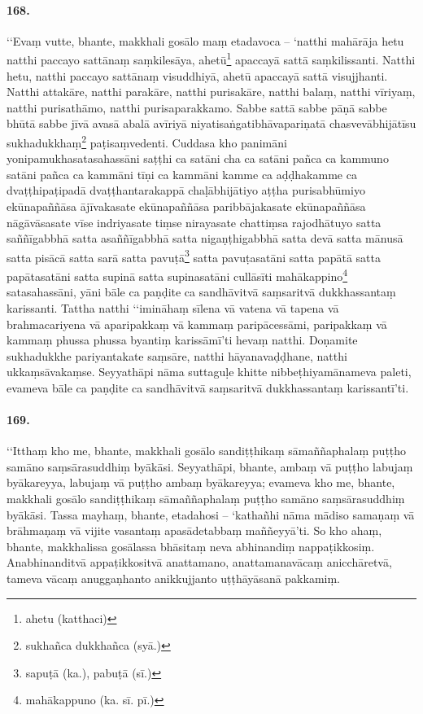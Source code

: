 \paragraph{168.} ‘‘Evaṃ vutte, bhante, makkhali gosālo maṃ etadavoca – ‘natthi mahārāja hetu natthi paccayo sattānaṃ saṃkilesāya, ahetū\footnote{ahetu (katthaci)} apaccayā sattā saṃkilissanti. Natthi hetu, natthi paccayo sattānaṃ visuddhiyā, ahetū apaccayā sattā visujjhanti. Natthi attakāre, natthi parakāre, natthi purisakāre, natthi balaṃ, natthi vīriyaṃ, natthi purisathāmo, natthi purisaparakkamo. Sabbe sattā sabbe pāṇā sabbe bhūtā sabbe jīvā avasā abalā avīriyā niyatisaṅgatibhāvapariṇatā chasvevābhijātīsu sukhadukkhaṃ\footnote{sukhañca dukkhañca (syā.)} paṭisaṃvedenti. Cuddasa kho panimāni yonipamukhasatasahassāni saṭṭhi ca satāni cha ca satāni pañca ca kammuno satāni pañca ca kammāni tīṇi ca kammāni kamme ca aḍḍhakamme ca dvaṭṭhipaṭipadā dvaṭṭhantarakappā chaḷābhijātiyo aṭṭha purisabhūmiyo ekūnapaññāsa ājīvakasate ekūnapaññāsa paribbājakasate ekūnapaññāsa nāgāvāsasate vīse indriyasate tiṃse nirayasate chattiṃsa rajodhātuyo satta saññīgabbhā satta asaññīgabbhā satta nigaṇṭhigabbhā satta devā satta mānusā satta pisācā satta sarā satta pavuṭā\footnote{sapuṭā (ka.), pabuṭā (sī.)} satta pavuṭasatāni satta papātā satta papātasatāni satta supinā satta supinasatāni cullāsīti mahākappino\footnote{mahākappuno (ka. sī. pī.)} satasahassāni, yāni bāle ca paṇḍite ca sandhāvitvā saṃsaritvā dukkhassantaṃ karissanti. Tattha natthi ‘‘imināhaṃ sīlena vā vatena vā tapena vā brahmacariyena vā aparipakkaṃ vā kammaṃ paripācessāmi, paripakkaṃ vā kammaṃ phussa phussa byantiṃ karissāmī’ti hevaṃ natthi. Doṇamite sukhadukkhe pariyantakate saṃsāre, natthi hāyanavaḍḍhane, natthi ukkaṃsāvakaṃse. Seyyathāpi nāma suttaguḷe khitte nibbeṭhiyamānameva paleti, evameva bāle ca paṇḍite ca sandhāvitvā saṃsaritvā dukkhassantaṃ karissantī’ti.

\paragraph{169.} ‘‘Itthaṃ kho me, bhante, makkhali gosālo sandiṭṭhikaṃ sāmaññaphalaṃ puṭṭho samāno saṃsārasuddhiṃ byākāsi. Seyyathāpi, bhante, ambaṃ vā puṭṭho labujaṃ byākareyya, labujaṃ vā puṭṭho ambaṃ byākareyya; evameva kho me, bhante, makkhali gosālo sandiṭṭhikaṃ sāmaññaphalaṃ puṭṭho samāno saṃsārasuddhiṃ byākāsi. Tassa mayhaṃ, bhante, etadahosi – ‘kathañhi nāma mādiso samaṇaṃ vā brāhmaṇaṃ vā vijite vasantaṃ apasādetabbaṃ maññeyyā’ti. So kho ahaṃ, bhante, makkhalissa gosālassa bhāsitaṃ neva abhinandiṃ nappaṭikkosiṃ. Anabhinanditvā appaṭikkositvā anattamano, anattamanavācaṃ anicchāretvā, tameva vācaṃ anuggaṇhanto anikkujjanto uṭṭhāyāsanā pakkamiṃ.

